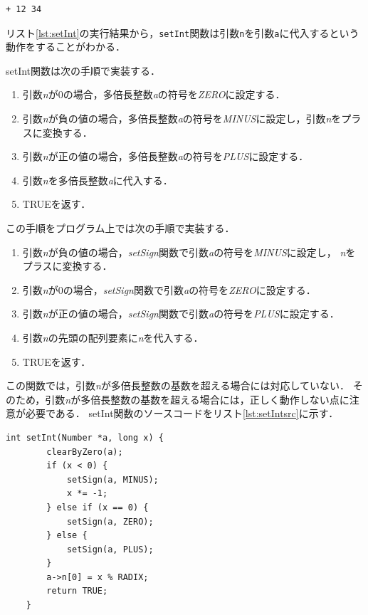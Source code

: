 \documentclass[a4paper,11pt,dvipdfmx]{jsarticle}
\begin{document}
\begin{lstlisting}[caption=リスト\ref{doSetInt}の実行結果,label=lst:setInt]
    + 12 34
\end{lstlisting}

リスト\ref{lst:setInt}の実行結果から，\texttt{setInt}関数は引数\texttt{n}を引数\texttt{a}に代入するという動作をすることがわかる．

setInt関数は次の手順で実装する．
\begin{enumerate}
    \item 引数\textit{n}が0の場合，多倍長整数\textit{a}の符号を\textit{ZERO}に設定する．
    \item 引数\textit{n}が負の値の場合，多倍長整数\textit{a}の符号を\textit{MINUS}に設定し，引数\textit{n}をプラスに変換する．
    \item 引数\textit{n}が正の値の場合，多倍長整数\textit{a}の符号を\textit{PLUS}に設定する．
    \item 引数\textit{n}を多倍長整数\textit{a}に代入する．
    \item TRUEを返す．
\end{enumerate}

この手順をプログラム上では次の手順で実装する．
\begin{enumerate}
    \item 引数\textit{n}が負の値の場合，\textit{setSign}関数で引数\textit{a}の符号を\textit{MINUS}に設定し，
    \textit{n}をプラスに変換する．
    \item 引数\textit{n}が0の場合，\textit{setSign}関数で引数\textit{a}の符号を\textit{ZERO}に設定する．
    \item 引数\textit{n}が正の値の場合，\textit{setSign}関数で引数\textit{a}の符号を\textit{PLUS}に設定する．
    \item 引数\textit{n}の先頭の配列要素に\textit{n}を代入する．
    \item TRUEを返す．
\end{enumerate}

この関数では，引数\textit{n}が多倍長整数の基数を超える場合には対応していない．
そのため，引数\textit{n}が多倍長整数の基数を超える場合には，正しく動作しない点に注意が必要である．
setInt関数のソースコードをリスト\ref{lst:setIntsrc}に示す．

\begin{lstlisting}[caption=setInt関数,label=lst:setIntsrc]
    int setInt(Number *a, long x) {
        clearByZero(a);
        if (x < 0) {
            setSign(a, MINUS);
            x *= -1;
        } else if (x == 0) {
            setSign(a, ZERO);
        } else {
            setSign(a, PLUS);
        }
        a->n[0] = x % RADIX;
        return TRUE;
    }
\end{lstlisting}
\end{document}
